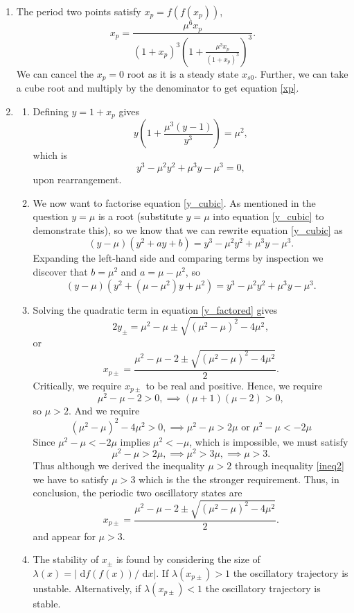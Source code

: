 \documentclass[10pt]{article}
\newcommand{\bb}{\begin{equation}}
\newcommand{\ee}{\end{equation}}
\newcommand{\rd}{\text{ d}}
\newcommand{\eqn}[1]{equation \eqref{#1}}
\renewcommand{\l}{\left(}
\renewcommand{\r}{\right)}
\begin{document}
\begin{Answ}
\begin{enumerate}
\item The period two points satisfy $x_p=f(f(x_p))$,
\bb
x_p={\frac {{\mu}^{6}x_p}{ \left( 1+x_p \right) ^{3} \left( 1+{\frac {{\mu}^{3}x_p}{ \left( 1+x_p \right) ^{3}}} \right) ^{3}}}.
\ee
We can cancel the $x_p=0$ root as it is a steady state $x_{s0}$. Further, we can take a cube root and multiply by the denominator to get \eqn{xp}.

\item 
\begin{enumerate}
\item Defining $y=1+x_p$ gives
\bb
y\l 1+\frac{\mu^3(y-1)}{y^3}\r=\mu^2,
\ee
which is
\bb
y^3-\mu^2y^2+\mu^3y-\mu^3=0,\label{y_cubic}
\ee
upon rearrangement.
\item We now want to factorise \eqn{y_cubic}. As mentioned in the question $y=\mu$ is a root (substitute $y=\mu$ into \eqn{y_cubic} to demonstrate this), so we know that we can rewrite \eqn{y_cubic} as
\bb
(y-\mu)(y^2+ay+b)=y^3-\mu^2y^2+\mu^3y-\mu^3.
\ee
Expanding the left-hand side and comparing terms by inspection we discover that $b=\mu^2$ and $a=\mu-\mu^2$, so
\bb
(y-\mu)(y^2+(\mu-\mu^2)y+\mu^2)=y^3-\mu^2y^2+\mu^3y-\mu^3.\label{y_factored}
\ee

\item Solving the quadratic term in \eqn{y_factored} gives
\bb
2y_\pm=\mu^2-\mu\pm\sqrt{\l\mu^2-\mu\r^2-4\mu^2},
\ee
or
\bb
x_{p\pm}=\frac{\mu^2-\mu-2\pm\sqrt{\l\mu^2-\mu\r^2-4\mu^2}}{2}.
\ee
Critically, we require $x_{p\pm}$ to be real and positive. Hence, we require
\bb
\mu^2-\mu-2>0, \implies (\mu+1)(\mu-2)>0,\label{ineq2}
\ee
so $\mu>2$. And we require
\bb
\l\mu^2-\mu\r^2-4\mu^2>0, \implies \mu^2-\mu>2\mu \textrm{ or }  \mu^2-\mu<-2\mu
\ee
Since $\mu^2-\mu<-2\mu$ implies $\mu^2<-\mu$, which is impossible, we must satisfy
\bb
\mu^2-\mu>2\mu, \implies \mu^2>3\mu, \implies \mu>3.
\ee
Thus although we derived the inequality $\mu>2$ through inequality \eqref{ineq2} we have to satisfy $\mu>3$ which is the the stronger requirement. Thus, in conclusion, the periodic two oscillatory states are
\bb
x_{p\pm}=\frac{\mu^2-\mu-2\pm\sqrt{\l\mu^2-\mu\r^2-4\mu^2}}{2}.
\ee
and appear for $\mu>3$.

\item The stability of $x_\pm$ is found by considering the size of $\lambda(x)=|\rd f(f(x))/\rd x|$. If $\lambda(x_{p\pm})>1$ the oscillatory trajectory is unstable. Alternatively, if $\lambda(x_{p\pm})<1$ the oscillatory trajectory is stable.


\end{enumerate}
\end{enumerate}
\end{Answ}
\end{document}
